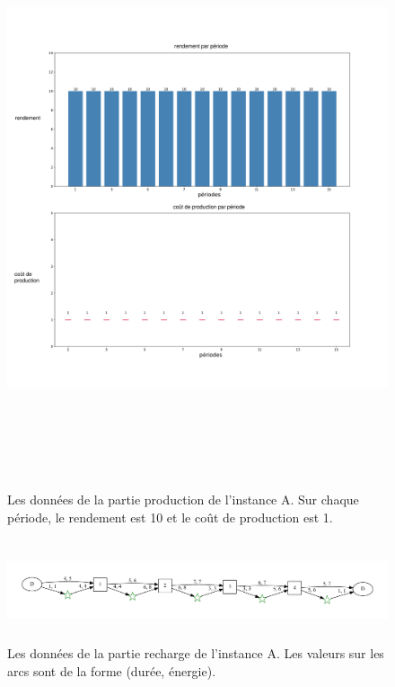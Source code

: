 	\begin{figure}[H]
	\centerline{
		\includegraphics[height=17cm]{images_these/DPS_inputU_0.pdf}}
	\caption[Les données de la partie production de l'instance A]{Les données de la partie production de l'instance A. Sur chaque période, le rendement est 10 et le coût de production est 1.}
	\label{Inst_0}
\end{figure}
\begin{figure}[H]
	\centerline{
		\includegraphics[height=3cm]{images_these/DPS_inputS_0.pdf}}
	\caption[Les données de la partie recharge de l'instance A]{Les données de la partie recharge de l'instance A. Les valeurs sur les arcs sont de la forme (durée, énergie).}
	\label{tourInst_0}
\end{figure}
